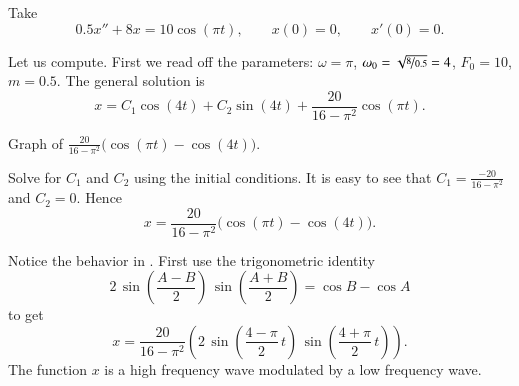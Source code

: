 \begin{example}
Take
\begin{equation*}
0.5 x'' + 8 x = 10 \cos (\pi t), \qquad x(0)=0, \qquad x'(0)=0 .
\end{equation*}

Let us compute.  First we read off the parameters:
$\omega = \pi$, $\omega_0 = \sqrt{\nicefrac{8}{0.5}} = 4$, $F_0 = 10$,
$m=0.5$.  The general solution is
\begin{equation*}
x = C_1 \cos (4 t) + C_2 \sin (4 t) +
\frac{20}{16 - \pi^2} \cos (\pi t) .
\end{equation*}

\begin{mywrapfig}{3.25in}
\capstart
{}
\caption{Graph of
$\frac{20}{16 - \pi^2} \bigl( \cos (\pi t)- \cos (4 t) \bigr)$.\label{3.6:beatingfig}}
\end{mywrapfig}
%
%


Solve for $C_1$ and $C_2$ using the initial conditions.
It is easy to see that
$C_1 = \frac{-20}{16 - \pi^2}$ and $C_2 = 0$.  Hence
\begin{equation*}
x = 
\frac{20}{16 - \pi^2} \bigl( \cos (\pi t)- \cos (4 t) \bigr) .
\end{equation*}


Notice the  behavior
in .  First
use the 
trigonometric identity
\begin{equation*}
2\,\sin \left( \frac{A-B}{2} \right) \,\sin \left( \frac{A+B}{2} \right) =
\cos B -\cos A 
\end{equation*}
to get 
\begin{equation*}
x = 
\frac{20}{16 - \pi^2} \left( 2 \, \sin \left(\frac{4-\pi}{2} \, t \right)
\,\sin \left( \frac{4+\pi}{2}\, t \right) \right) .
\end{equation*}
The function $x$ is a high frequency wave modulated by a low frequency
wave.
\end{example}

